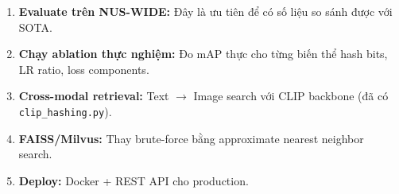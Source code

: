 \documentclass[13pt,a4paper]{article}
\begin{document}
\begin{enumerate}
    \item \textbf{Evaluate trên NUS-WIDE:} Đây là ưu tiên để có số liệu so sánh được với SOTA.
    \item \textbf{Chạy ablation thực nghiệm:} Đo mAP thực cho từng biến thể hash bits, LR ratio, loss components.
    \item \textbf{Cross-modal retrieval:} Text $\to$ Image search với CLIP backbone (đã có \texttt{clip\_hashing.py}).
    \item \textbf{FAISS/Milvus:} Thay brute-force bằng approximate nearest neighbor search.
    \item \textbf{Deploy:} Docker + REST API cho production.
\end{enumerate}


\newpage
\end{document}
